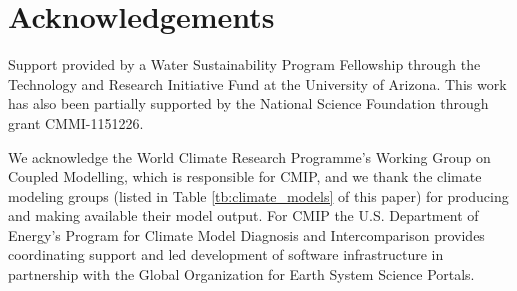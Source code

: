 \documentclass[opre,nonblindrev]{informs3} %
\begin{document}
\section*{Acknowledgements}
Support provided by a Water Sustainability Program Fellowship through the Technology and Research Initiative Fund at the University of Arizona.
This work has also been partially supported by the National Science Foundation through grant CMMI-1151226.

We acknowledge the World Climate Research Programme's Working Group on Coupled Modelling, which is responsible for CMIP, and we thank the climate modeling groups (listed in Table \ref{tb:climate_models} of this paper) for producing and making available their model output.
For CMIP the U.S. Department of Energy's Program for Climate Model Diagnosis and Intercomparison provides coordinating support and led development of software infrastructure in partnership with the Global Organization for Earth System Science Portals.







\end{document}
